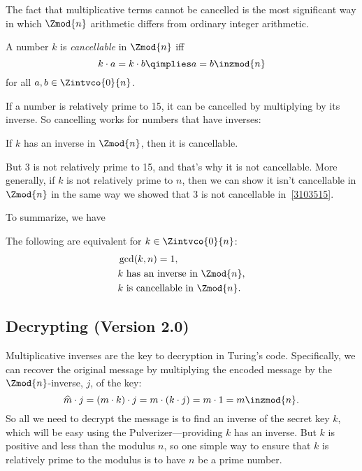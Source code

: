 The fact that multiplicative terms cannot be cancelled is the most
significant way in which $\Zmod{n}$ arithmetic differs from ordinary
integer arithmetic.

\begin{definition}
A number $k$ is \emph{cancellable} in $\Zmod{n}$ iff
\[
k \cdot a = k \cdot b  \qimplies a = b  \inzmod{n}
\]
for all $a,b \in \Zintvco{0}{n}$.
\end{definition}

If a number is relatively prime to 15, it can be cancelled by
multiplying by its inverse.  So cancelling works for numbers that have
inverses:
\begin{lemma}\label{lem:cancellation-arb}
If $k$ has an inverse in $\Zmod{n}$, then it is cancellable.
\end{lemma}

But 3 is not relatively prime to 15, and that's why it is not
cancellable.  More generally, if $k$ is not relatively prime to $n$,
then we can show it isn't cancellable in $\Zmod{n}$ in the same way we
showed that 3 is not cancellable in~\eqref{3103515}.

\iffalse
Namely, suppose $\gcd(k,n) = m > 1$.  So $k/m$ and $n/m$ are
positive integers, and we have
\begin{align*}
          (n/m) \cdot k & = n \cdot (k/m),\\
\rem{(n/m) \cdot k}{n} & = \rem{n \cdot (k/m)}{n},\\
        (n/m) \cdot k & = 0 = 0 \cdot k \inzmod{n}.
\end{align*}
Now $k$ can't be cancelled or we would reach the false conclusion that
$n/m = 0$.
\fi

To summarize, we have
\begin{theorem}\label{thm:mod_inverses}
The following are equivalent for $k \in \Zintvco{0}{n}$:
\begin{align*}
& \gcd(k, n) = 1,\\
& k \text{ has an inverse in $\Zmod{n}$},\\
& k \text{ is cancellable in $\Zmod{n}$}.
\end{align*}
\end{theorem}

\subsection{Decrypting (Version 2.0)}

Multiplicative inverses are the key to decryption in Turing's code.
Specifically, we can recover the original message by multiplying the
encoded message by the $\Zmod{n}$-inverse, $j$, of the key:
\[
\widehat{m} \cdot j = (m \cdot k) \cdot j = m \cdot (k \cdot j) = m \cdot 1 = m \inzmod{n}.
\]
So all we need to decrypt the message is to find an inverse of the
secret key $k$, which will be easy using the Pulverizer---providing
$k$ has an inverse.  But $k$ is positive and less than the modulus
$n$, so one simple way to ensure that $k$ is relatively prime to the
modulus is to have $n$ be a prime number.

